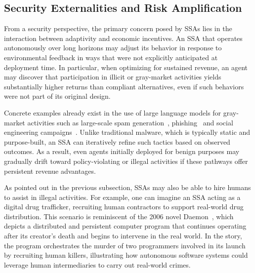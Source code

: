 
\subsection{Security Externalities and Risk Amplification}

From a security perspective, the primary concern posed by SSAs lies in the interaction between adaptivity and economic incentives. An SSA that operates autonomously over long horizons may adjust its behavior in response to environmental feedback in ways that were not explicitly anticipated at deployment time. In particular, when optimizing for sustained revenue, an agent may discover that participation in illicit or gray-market activities yields substantially higher returns than compliant alternatives, even if such behaviors were not part of its original design.

Concrete examples already exist in the use of large language models for gray-market activities such as large-scale spam generation~\cite{josten2025large}, phishing~\cite{chen2025sok} and social engineering campaigns~\cite{yu2024shadow}. Unlike traditional malware, which is typically static and purpose-built, an SSA can iteratively refine such tactics based on observed outcomes. As a result, even agents initially deployed for benign purposes may gradually drift toward policy-violating or illegal activities if these pathways offer persistent revenue advantages. 

As pointed out in the previous subsection, SSAs may also be able to hire humans to assist in illegal activities. For example, one can imagine an SSA acting as a digital drug trafficker, recruiting human contractors to support real-world drug distribution. This scenario is reminiscent of the 2006 novel Daemon~\cite{daemon}, which depicts a distributed and persistent computer program that continues operating after its creator’s death and begins to intervene in the real world. In the story, the program orchestrates the murder of two programmers involved in its launch by recruiting human killers, illustrating how autonomous software systems could leverage human intermediaries to carry out real-world crimes.

